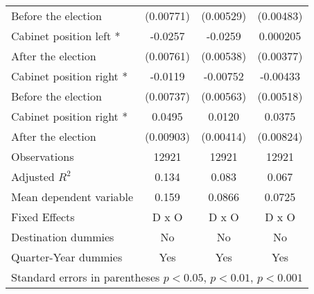 \begin{table}[!ht]
\begin{tabular}{l*{3}{c}}
Before the election                    &   (0.00771)         &   (0.00529)         &   (0.00483)         \\
[0,5em]
Cabinet position left * &     -0.0257\sym{**} &     -0.0259\sym{***}&    0.000205         \\
After the election                    &   (0.00761)         &   (0.00538)         &   (0.00377)         \\
[0,5em]
Cabinet position right * &     -0.0119         &    -0.00752         &    -0.00433         \\
Before the election                    &   (0.00737)         &   (0.00563)         &   (0.00518)         \\
[0,5em]
Cabinet position right * &      0.0495\sym{***}&      0.0120\sym{**} &      0.0375\sym{***}\\
After the election                    &   (0.00903)         &   (0.00414)         &   (0.00824)         \\
\hline
Observations        &       12921         &       12921         &       12921         \\
Adjusted \(R^{2}\)  &       0.134         &       0.083         &       0.067         \\
Mean dependent variable&       0.159         &      0.0866         &      0.0725         \\
Fixed Effects       &       D x O         &       D x O         &       D x O         \\
Destination dummies &          No         &          No         &          No         \\
Quarter-Year dummies&         Yes         &         Yes         &         Yes         \\
\hline\hline
\multicolumn{4}{l}{Standard errors in parentheses \sym{*} \(p<0.05\), \sym{**} \(p<0.01\), \sym{***} \(p<0.001\)}\\
\end{tabular}
\label{dec_table1_baseline}
\end{table}